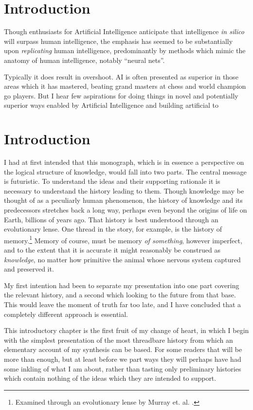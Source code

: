 \documentclass[10pt,titlepage]{book}
\begin{document}
\chapter{Introduction}

Though enthusiasts for Artificial Intelligence anticipate that intelligence \emph{in silico} will surpass human intelligence, the emphasis has seemed to be substantially upon \emph{replicating} human intelligence, predominantly by methods which mimic the anatomy of human intelligence, notably ``neural nets''.

Typically it does result in overshoot.
AI is often presented as superior in those areas which it has mastered, beating grand masters at chess and world champion go players.
But I hear few aspirations for doing things in novel and potentially superior ways enabled by Artificial Intelligence and building artificial to 

\chapter{Introduction}

I had at first intended that this monograph, which is in essence a perspective on the logical structure of knowledge, would fall into two parts.
The central message is futuristic.
To understand the ideas and their supporting rationale it is necessary to understand the history leading to them.
Though knowledge may be thought of as a peculiarly human phenomenon, the history of knowledge and its predecessors stretches back a long way, perhaps even beyond the origins of life on Earth, billions of years ago.
That history is best understood through an evolutionary lense.
One thread in the story, for example, is the history of memory.\footnote{Examined through an evolutionary lense by Murray et. al. \cite{murray2017evolution}.}
Memory of course, must be memory \emph{of something}, however imperfect, and to the extent that it is accurate it might reasonably be construed as \emph{knowledge}, no matter how primitive the animal whose nervous system captured and preserved it.

My first intention had been to separate my presentation into one part covering the relevant history, and a second which looking to the future from that base.
This would leave the moment of truth far too late, and I have concluded that a completely different approach is essential.

This introductory chapter is the first fruit of my change of heart, in which I begin with the simplest presentation of the most threadbare history from which an elementary account of my synthesis can be based.
For some readers that will be more than enough, but at least before we part ways they will perhaps have had some inkling of what I am about, rather than tasting only preliminary histories which contain nothing of the ideas which they are intended to support.
\end{document}
